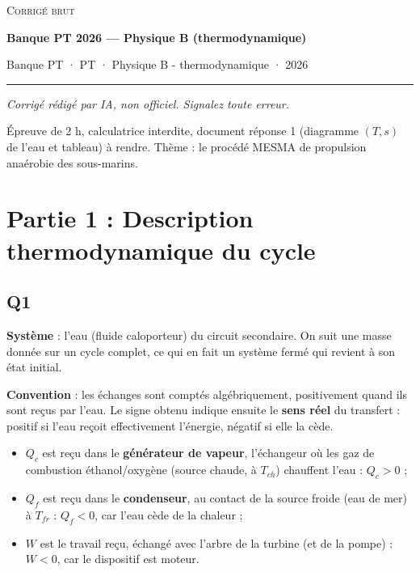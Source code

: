 \documentclass[11pt,a4paper]{article}
\providecommand{\tightlist}{\setlength{\itemsep}{0pt}\setlength{\parskip}{0pt}}
\begin{document}
\thispagestyle{plain}
\begin{center}
  {\small\scshape Corrigé brut}\par\smallskip
  {\LARGE\bfseries Banque PT 2026 — Physique B (thermodynamique)\par}\medskip
  {\large Banque PT · PT · Physique B - thermodynamique · 2026\par}
\end{center}
\vspace{2pt}\hrule\vspace{8pt}

\emph{Corrigé rédigé par IA, non officiel. Signalez toute erreur.}

Épreuve de 2 h, calculatrice interdite, document réponse 1 (diagramme \((T,s)\) de l'eau et tableau) à rendre. Thème : le procédé MESMA de propulsion anaérobie des sous-marins.

\hypertarget{partie-1-description-thermodynamique-du-cycle}{%
\section{Partie 1 : Description thermodynamique du cycle}\label{partie-1-description-thermodynamique-du-cycle}}

\hypertarget{q1}{%
\subsection{Q1}\label{q1}}

\textbf{Système} : l'eau (fluide caloporteur) du circuit secondaire. On suit une masse donnée sur un cycle complet, ce qui en fait un système fermé qui revient à son état initial.

\textbf{Convention} : les échanges sont comptés algébriquement, positivement quand ils sont reçus par l'eau. Le signe obtenu indique ensuite le \textbf{sens réel} du transfert : positif si l'eau reçoit effectivement l'énergie, négatif si elle la cède.

\begin{itemize}
\tightlist
\item
  \(Q_c\) est reçu dans le \textbf{générateur de vapeur}, l'échangeur où les gaz de combustion éthanol/oxygène (source chaude, à \(T_{ch}\)) chauffent l'eau : \(Q_c>0\) ;
\item
  \(Q_f\) est reçu dans le \textbf{condenseur}, au contact de la source froide (eau de mer) à \(T_{fr}\) : \(Q_f<0\), car l'eau cède de la chaleur ;
\item
  \(W\) est le travail reçu, échangé avec l'arbre de la turbine (et de la pompe) : \(W<0\), car le dispositif est moteur.
\end{itemize}
\end{document}
